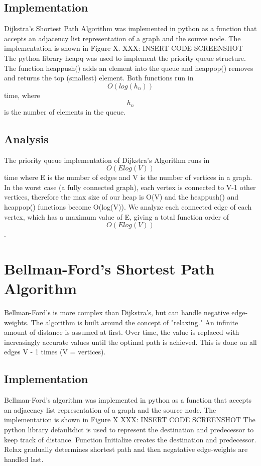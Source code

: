 \subsection{Implementation}
	Dijkstra's Shortest Path Algorithm was implemented in python as a function that accepts an adjacency list representation of a graph and the source node. The implementation is shown in Figure X.
XXX: INSERT CODE SCREENSHOT
       The python library heapq was used to implement the priority queue structure. The function heappush() adds an element into the queue and heappop() removes and returns the top (smallest) element. Both functions run in \[O(log(h_n))\] time, where \[h_n\] is the number of elements in the queue.

\subsection{Analysis}
	The priority queue implementation of Dijkstra's Algorithm runs in \[O(Elog(V))\] time where E is the number of edges and V is the number of vertices in a graph. In the worst case (a fully connected graph), each vertex is connected to V-1 other vertices, therefore the max size of our heap is O(V) and the heappush() and heappop() functions become O(log(V)). We analyze each connected edge of each vertex, which has a maximum value of E, giving a total function order of \[O(Elog(V))\].

\section{Bellman-Ford's Shortest Path Algorithm}
  Bellman-Ford's is more complex than Dijkstra's, but can handle negative edge-weights. The algorithm is built around the concept of "relaxing." An infinite amount of distance is assumed at first. Over time, the value is replaced with increasingly accurate values until the optimal path is achieved. This is done on all edges V - 1 times (V = vertices).

\subsection{Implementation}
  Bellman-Ford's algorithm was implemented in python as a function that accepts an adjacency list representation of a graph and the source node. The implementation is shown in Figure X
XXX: INSERT CODE SCREENSHOT
        The python library defaultdict is used to represent the destination and predecessor to keep track of distance. Function Initialize creates the destination and predecessor. Relax gradually determines shortest path and then negatative edge-weights are handled last.

